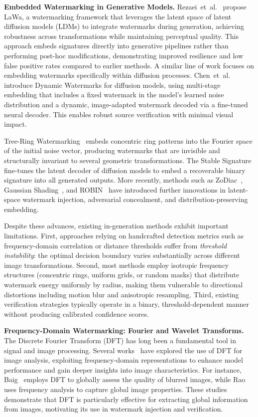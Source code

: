 \documentclass[lettersize,journal,review]{IEEEtran}
\begin{document}
\noindent
\textbf{Embedded Watermarking in Generative Models.}
Rezaei~et~al.~\cite{rezaei2024lawa} propose LaWa, a watermarking framework that 
leverages the latent space of latent diffusion models (LDMs) to integrate watermarks 
during generation, achieving robustness across transformations while maintaining 
perceptual quality. This approach embeds signatures directly into generative pipelines 
rather than performing post-hoc modifications, demonstrating improved resilience and 
low false positive rates compared to earlier methods. A similar line of work focuses 
on embedding watermarks specifically within diffusion processes. 
Chen~et~al.~\cite{chen2025tagwm} introduce Dynamic Watermarks for diffusion models, 
using multi-stage embedding that includes a fixed watermark in the model's learned noise 
distribution and a dynamic, image-adapted watermark decoded via a fine-tuned neural 
decoder. This enables robust source verification with minimal visual impact.

Tree-Ring Watermarking~\cite{wen2023tree_ring} embeds concentric ring patterns into 
the Fourier space of the initial noise vector, producing watermarks that are invisible 
and structurally invariant to several geometric transformations. 
The Stable Signature~\cite{fernandez2023stable} fine-tunes the latent decoder of 
diffusion models to embed a recoverable binary signature into all generated outputs. 
More recently, methods such as ZoDiac~\cite{zhang2024attack}, 
Gaussian Shading~\cite{yang2024gaussian}, and ROBIN~\cite{huang2024robin} have 
introduced further innovations in latent-space watermark injection, adversarial concealment, and distribution-preserving embedding.

Despite these advances, existing in-generation methods exhibit important limitations. 
First, approaches relying on handcrafted detection metrics such as frequency-domain 
correlation or distance thresholds suffer from \emph{threshold instability}: the optimal 
decision boundary varies substantially across different image transformations. 
Second, most methods employ isotropic frequency structures (concentric rings, uniform 
grids, or random masks) that distribute watermark energy uniformly by radius, making 
them vulnerable to directional distortions including motion blur and anisotropic 
resampling. Third, existing verification strategies typically operate in a binary, 
threshold-dependent manner without producing calibrated confidence scores.

\noindent\textbf{Frequency-Domain Watermarking: Fourier and Wavelet Transforms.}
The Discrete Fourier Transform (DFT) has long been a fundamental tool in signal and 
image processing. Several works~\cite{jia2023fourier, jiang2021focal, rao2021global, 
yu2022deep} have explored the use of DFT for image analysis, exploiting 
frequency-domain representations to enhance model performance and gain deeper 
insights into image characteristics. For instance, Baig~\cite{baig2022dft} employs 
DFT to globally assess the quality of blurred images, while 
Rao~\cite{rao2021global} uses frequency analysis to capture global image properties. 
These studies demonstrate that DFT is particularly effective for extracting global 
information from images, motivating its use in watermark injection and verification.
\end{document}
